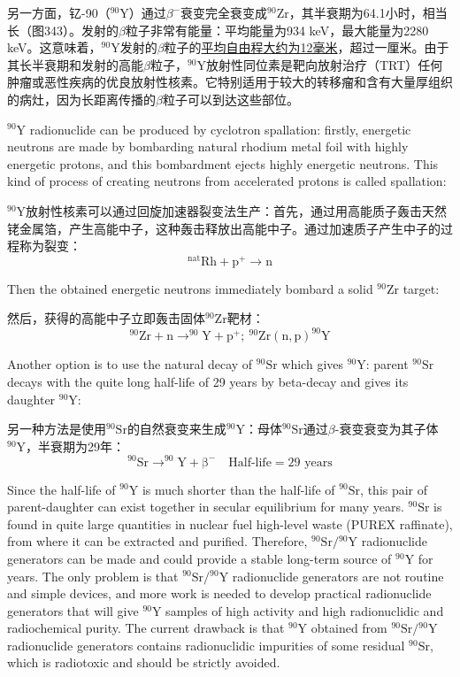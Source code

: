 \documentclass[dvipsnames, svgnames,a4paper,11pt]{article}
\begin{document}
另一方面，钇-90（\(\mathrm{^{90}Y}\)）通过\(\beta^{-}\)衰变完全衰变成\(\mathrm{^{90}Zr}\)，其半衰期为64.1小时，相当长（图343）。发射的\(\beta\)粒子非常有能量：平均能量为934 keV，最大能量为2280 keV。这意味着，\(\mathrm{^{90}Y}\)发射的\(\beta\)粒子的\underline{平均自由程大约为12毫米}，超过一厘米。由于其长半衰期和发射的高能\(\beta\)粒子，\(\mathrm{^{90}Y}\)放射性同位素是靶向放射治疗（TRT）任何肿瘤或恶性疾病的优良放射性核素。它特别适用于较大的转移瘤和含有大量厚组织的病灶，因为长距离传播的\(\beta\)粒子可以到达这些部位。

\(\mathrm{^{90}Y}\) radionuclide can be produced by cyclotron spallation: firstly, energetic neutrons are made by bombarding natural rhodium metal foil with highly energetic protons, and this bombardment ejects highly energetic neutrons. This kind of process of creating neutrons from accelerated protons is called spallation:

\(\mathrm{^{90}Y}\)放射性核素可以通过回旋加速器裂变法生产：首先，通过用高能质子轰击天然铑金属箔，产生高能中子，这种轰击释放出高能中子。通过加速质子产生中子的过程称为裂变：
\[
\mathrm{{}^{nat}Rh + p^{+} \to n}
\]

Then the obtained energetic neutrons immediately bombard a solid \(\mathrm{^{90}Zr}\) target:

然后，获得的高能中子立即轰击固体\(\mathrm{^{90}Zr}\)靶材：
\[
\mathrm{^{90}Zr + n \to ^{90}Y + p^{+}; \ ^{90}Zr(n,p)^{90}Y}
\]

Another option is to use the natural decay of \(\mathrm{^{90}Sr}\) which gives \(\mathrm{^{90}Y}\): parent \(\mathrm{^{90}Sr}\) decays with the quite long half-life of 29 years by beta-decay and gives its daughter \(\mathrm{^{90}Y}\):

另一种方法是使用\(\mathrm{^{90}Sr}\)的自然衰变来生成\(\mathrm{^{90}Y}\)：母体\(\mathrm{^{90}Sr}\)通过\(\beta\)-衰变衰变为其子体\(\mathrm{^{90}Y}\)，半衰期为29年：
\[
\mathrm{^{90}Sr \to ^{90}Y + \beta^{-}} \quad \text{Half-life} = 29 \text{ years}
\]

Since the half-life of \(\mathrm{^{90}Y}\) is much shorter than the half-life of \(\mathrm{^{90}Sr}\), this pair of parent-daughter can exist together in secular equilibrium for many years. \(\mathrm{^{90}Sr}\) is found in quite large quantities in nuclear fuel high-level waste (PUREX raffinate), from where it can be extracted and purified. Therefore, \(\mathrm{^{90}Sr}/\mathrm{^{90}Y}\) radionuclide generators can be made and could provide a stable long-term source of \(\mathrm{^{90}Y}\) for years. The only problem is that \(\mathrm{^{90}Sr}/\mathrm{^{90}Y}\) radionuclide generators are not routine and simple devices, and more work is needed to develop practical radionuclide generators that will give \(\mathrm{^{90}Y}\) samples of high activity and high radionuclidic and radiochemical purity. The current drawback is that \(\mathrm{^{90}Y}\) obtained from \(\mathrm{^{90}Sr}/\mathrm{^{90}Y}\) radionuclide generators contains radionuclidic impurities of some residual \(\mathrm{^{90}Sr}\), which is radiotoxic and should be strictly avoided.
\end{document}
